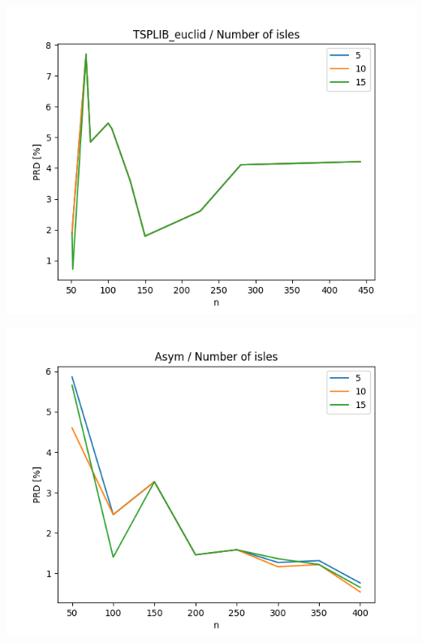 \documentclass{article}
\begin{document}
\begin{center}
\includegraphics[width=\textwidth, 
                   height = 0.4\textheight, 
                   keepaspectratio]
                  {plots/tsplib_euclid_10_isles} 
\end{center}

\begin{center}
\includegraphics[width=\textwidth, 
                   height = 0.4\textheight, 
                   keepaspectratio]
                  {plots/asym_10_isles} 
\end{center}
\end{document}
